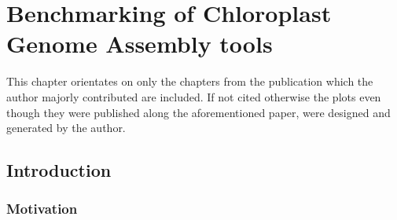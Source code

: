 \newcommand{\formatprogramnames}[1]{\texttt{#1}}
\newcommand{\ce}{\formatprogramnames{chloroExtractor}}
\newcommand{\oa}{\formatprogramnames{ORG.Asm}}
\newcommand{\fp}{\formatprogramnames{Fast-Plast}}
\newcommand{\ioga}{\formatprogramnames{IOGA}}
\newcommand{\np}{\formatprogramnames{NOVOPlasty}}
\newcommand{\go}{\formatprogramnames{GetOrganelle}}
\newcommand{\cassp}{\formatprogramnames{Chloroplast assembly protocol}}



\chapter{Benchmarking of Chloroplast Genome Assembly tools } %

\label{Chapter1} %
This chapter orientates on \cite{freudenthal2019landscape} only the chapters from the publication which the author majorly contributed are included. If not cited otherwise the plots even though they were published along the aforementioned paper, were designed and generated by the author.


\newcommand{\keyword}[1]{\textbf{#1}}
\newcommand{\tabhead}[1]{\textbf{#1}}
\newcommand{\code}[1]{\texttt{#1}}
\newcommand{\file}[1]{\texttt{\bfseries#1}}
\newcommand{\option}[1]{\texttt{\itshape#1}}


\section{Introduction} \label{intro:cp}
\subsection{Motivation}


